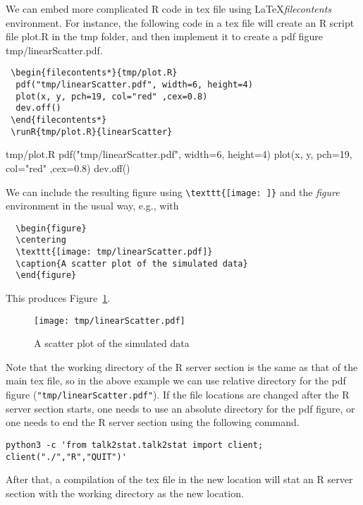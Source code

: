 \documentclass[12pt]{amsart}
\begin{document}
We can embed more complicated R code in tex file using \LaTeX\space \textit{filecontents} environment. For instance, the following code in a tex file will create an R script file plot.R in the tmp folder, and then implement it to create a pdf figure tmp/linearScatter.pdf.
\begin{verbatim}
 \begin{filecontents*}{tmp/plot.R}
  pdf("tmp/linearScatter.pdf", width=6, height=4)
  plot(x, y, pch=19, col="red" ,cex=0.8)
  dev.off()
 \end{filecontents*}
 \runR{tmp/plot.R}{linearScatter}
\end{verbatim}
\begin{filecontents*}{tmp/plot.R}
  pdf("tmp/linearScatter.pdf", width=6, height=4)
  plot(x, y, pch=19, col="red" ,cex=0.8)
  dev.off()
\end{filecontents*}
We can include the resulting figure using \verb|\texttt{[image: ]}| and the \textit{figure} environment in the usual way, e.g., with
\begin{verbatim}
  \begin{figure}
  \centering
  \texttt{[image: tmp/linearScatter.pdf]}
  \caption{A scatter plot of the simulated data}
  \end{figure}
\end{verbatim}
This produces Figure~\ref{fig:1}.

\begin{figure}[h]
\centering
\texttt{[image: tmp/linearScatter.pdf]}
\caption{A scatter plot of the simulated data}\label{fig:1}
\end{figure}

Note that the working directory of the R server section is the same as that of the main tex file, so in the above example we can use relative directory for the pdf figure (\verb|"tmp/linearScatter.pdf"|). If the file locations are changed after the R server section starts, one needs to use an absolute directory for the pdf figure, or one needs to end the R server section using the following command.
\begin{verbatim}
python3 -c 'from talk2stat.talk2stat import client; client("./","R","QUIT")'
\end{verbatim}
After that, a compilation of the tex file in the new location will stat an R server section with the working directory as the new location.




\end{document}
